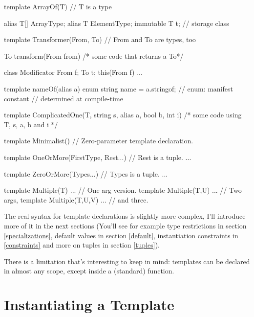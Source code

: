 \begin{dcode}
template ArrayOf(T) // T is a type
{
    alias T[] ArrayType;
    alias T ElementType;
    immutable T t; // storage class

}

template Transformer(From, To) // From and To are types, too
{
    To transform(From from) { /* some code that returns a To*/}

    class Modificator
    {
        From f;
        To t;
        this(From f) { ... }
    }
}

template nameOf(alias a)
{
    enum string name = a.stringof; // enum: manifest constant
                                   // determined at compile-time
}

template ComplicatedOne(T, string s, alias a, bool b, int i)
{ /* some code using T, s, a, b and i */ }

template Minimalist() {} // Zero-parameter template declaration.

template OneOrMore(FirstType, Rest...) // Rest is a tuple.
{ ... }

template ZeroOrMore(Types...) // Types is a tuple.
{ ... }

template Multiple(T)     { ... } // One arg version.
template Multiple(T,U)   { ... } // Two args,
template Multiple(T,U,V) { ... } // and three.
\end{dcode}

The real syntax for template declarations is slightly more complex, I'll introduce more of it in the next sections (You'll see for example type restrictions in section \ref{specializations}, default values in section \ref{default}, instantiation constraints in \ref{constraints} and more on tuples in section \ref{tuples}).

There is a limitation that's interesting to keep in mind: templates can be declared in almost any scope, except inside a (standard) function.


\section{Instantiating a Template}\label{instantiating}


